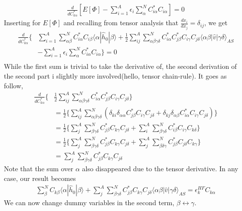 \documentclass[11pt]{article}
\begin{document}
\begin{align*}
	\frac{d}{d C^*_{k\alpha}} \left[E[\Phi] - \sum_{i=1}^A \epsilon_i \sum_{\alpha}^N C_{i\alpha}^*C_{i\alpha}\right] = 0
\end{align*}
Inserting for $E[\Phi]$ and recalling from tensor analysis that $\frac{dx_i}{dx_j} = \delta_{ij}$, we get
\begin{align*}
	\frac{d}{d C^*_{k\alpha}} \bigg\{ &\sum^A_{i=1} \sum^N_{\alpha\beta} C^*_{i\alpha} C_{i\beta} \langle\alpha|\hat{h}_0|\beta\rangle + \frac{1}{2}\sum^A_{ij}\sum^N_{\alpha\beta\gamma\delta} C^*_{i\alpha}C^*_{j\beta}C_{i\gamma}C_{j\delta} \langle \alpha\beta|\hat{v}|\gamma\delta\rangle_{AS} \\
	&- \sum_{i=1}^A \epsilon_i \sum_{\alpha}^N C_{i\alpha}^*C_{i\alpha}\bigg\} = 0 \\
\end{align*}
While the first sum is trivial to take the derivative of, the second derivation of the second part i slightly more involved(hello, tensor chain-rule). It goes as follow,
\begin{align*}
	\frac{d}{d C^*_{k\alpha}}\bigg\{ &\frac{1}{2}\sum^A_{ij}\sum^N_{\alpha\beta\gamma\delta} C^*_{i\alpha}C^*_{j\beta}C_{i\gamma}C_{j\delta} \bigg\} \\
	&= \frac{1}{2} \bigg\{\sum^A_{ij}\sum^N_{\alpha\beta\gamma\delta} (\delta_{ki} \delta_{\alpha\alpha} C^*_{j\beta}C_{i\gamma}C_{j\delta} + \delta_{kj} \delta_{\alpha\beta} C^*_{i\alpha}C_{i\gamma}C_{j\delta}) \bigg\} \\
	&= \frac{1}{2} \bigg\{\sum^A_{j} \sum^N_{\beta\gamma\delta} C^*_{j\beta}C_{k\gamma}C_{j\delta} + \sum^A_{i} \sum^N_{\beta\gamma\delta} C^*_{i\beta}C_{i\gamma}C_{k\delta} \bigg\} \\
	&= \frac{1}{2} \bigg\{\sum^A_{j} \sum^N_{\beta\gamma\delta} C^*_{j\beta}C_{k\gamma}C_{j\delta} + \sum^A_{j} \sum^N_{\beta\delta\gamma} C^*_{j\beta}C_{j\delta}C_{k\gamma}\bigg\} \\
	&= \sum^A_{j} \sum^N_{\beta\gamma\delta} C^*_{j\beta}C_{k\gamma}C_{j\delta}
\end{align*}
Note that the sum over $\alpha$ also disappeared due to the tensor derivative. In any case, our result becomes
\begin{align*}
	\sum^N_{\beta} C_{k\beta} \langle\alpha|\hat{h}_0|\beta\rangle + \sum^A_{j}\sum^N_{\beta\gamma\delta} C^*_{j\beta}C_{k\gamma}C_{j\delta} \langle \alpha\beta|\hat{v}|\gamma\delta\rangle_{AS} = \epsilon_k^{HF} C_{k\alpha}
\end{align*}
We can now change dummy variables in the second term, $\beta \leftrightarrow \gamma$.
\end{document}
